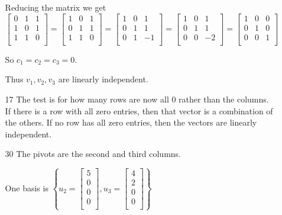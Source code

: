 \documentclass[12pt,letterpaper]{article}
\begin{document}
\begin{enumerate}[label=\S 2.\arabic*]
\begin{enumerate}
          Reducing the matrix we get
          \[
            \begin{bmatrix}
              0 & 1 & 1 \\
              1 & 0 & 1 \\
              1 & 1 & 0 \\
            \end{bmatrix}
            =
            \begin{bmatrix}
              1 & 0 & 1 \\
              0 & 1 & 1 \\
              1 & 1 & 0 \\
            \end{bmatrix}
            =
            \begin{bmatrix}
              1 & 0 &  1 \\
              0 & 1 &  1 \\
              0 & 1 & -1 \\
            \end{bmatrix}
            =
            \begin{bmatrix}
              1 & 0 &  1 \\
              0 & 1 &  1 \\
              0 & 0 & -2 \\
            \end{bmatrix}
            =
            \begin{bmatrix}
              1 & 0 & 0 \\
              0 & 1 & 0 \\
              0 & 0 & 1 \\
            \end{bmatrix}
          \]

          So $c_1 = c_2 = c_3 = 0$.

          Thus $v_1, v_2, v_3$ are linearly independent.
        \item [17]
          The test is for how many rows are now all 0 rather than the columns.
          If there is a row with all zero entries,
          then that vector is a combination of the others.
          If no row has all zero entries,
          then the vectors are linearly independent.
        \item [30]
          The pivots are the second and third columns.

          One basis is
          $\left\{
            u_2 =
            \begin{bmatrix}5 \\ 0 \\ 0 \\ 0 \\\end{bmatrix}
            ,
            u_3 =
            \begin{bmatrix}4 \\ 2 \\ 0 \\ 0 \\\end{bmatrix}
          \right\}$


\end{enumerate}
\end{enumerate}
\end{document}
